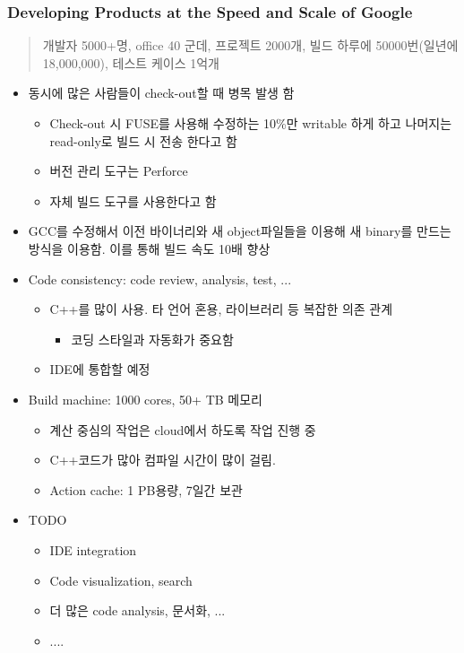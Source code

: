 \begin{frame}[allowframebreaks]
\frametitle{Developing Products at the Speed and Scale of Google}

\begin{quote}
개발자 5000+명, office 40 군데, 프로젝트 2000개, 빌드 하루에 50000번(일년에 18,000,000), 테스트 케이스 1억개
\end{quote}

\begin{itemize}
\item 동시에 많은 사람들이 check-out할 때 병목 발생 함
    \begin{itemize}
    \item Check-out 시 FUSE를 사용해 수정하는 10\%만 writable 하게 하고 나머지는 read-only로 빌드 시 전송 한다고 함
    \item 버전 관리 도구는 Perforce
    \item 자체 빌드 도구를 사용한다고 함
    \end{itemize}
\item GCC를 수정해서  이전 바이너리와 새 object파일들을 이용해 새 binary를 만드는 방식을 이용함. 이를 통해 빌드 속도 10배 향상

\item Code consistency: code review, analysis, test, ...
    \begin{itemize}
    \item C++를 많이 사용. 타 언어 혼용, 라이브러리 등 복잡한 의존 관계
      \begin{itemize}
      \item 코딩 스타일과 자동화가 중요함
      \end{itemize}
    \item IDE에 통합할 예정
    \end{itemize}

\item Build machine: 1000 cores, 50+ TB 메모리
    \begin{itemize}
    \item 계산 중심의 작업은 cloud에서 하도록 작업 진행 중
    \item C++코드가 많아 컴파일 시간이 많이 걸림.
    \item Action cache: 1 PB용량, 7일간 보관
    \end{itemize}

\item TODO
    \begin{itemize}
    \item IDE integration 
    \item Code  visualization, search
    \item 더 많은 code analysis, 문서화, ...
    \item .... 
    \end{itemize}
\end{itemize}

\end{frame}

